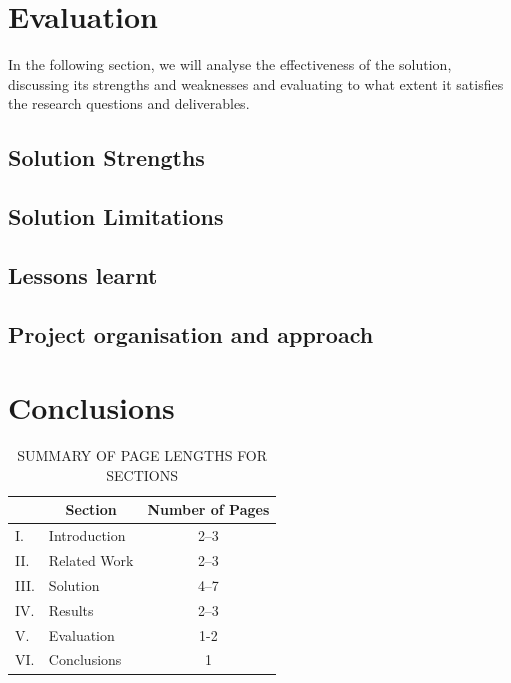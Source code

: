\documentclass[12pt,a4paper]{article}
\begin{document}

\section{Evaluation}
In the following section, we will analyse the effectiveness of the solution, discussing its strengths and weaknesses and evaluating to what extent it satisfies the research questions and deliverables.

\subsection{Solution Strengths}

\subsection{Solution Limitations}

\subsection{Lessons learnt}

\subsection{Project organisation and approach}




\section{Conclusions}



\begin{table}[htb]
\centering
\caption{SUMMARY OF PAGE LENGTHS FOR SECTIONS}
\vspace*{6pt}
\label{summary}
\begin{tabular}{|ll|c|} \hline
& \multicolumn{1}{c|}{\bf Section} & {\bf Number of Pages} \\ \hline
I. & Introduction & 2--3 \\ \hline
II. & Related Work & 2--3 \\ \hline
III. & Solution & 4--7 \\ \hline
IV. & Results & 2--3 \\ \hline
V. & Evaluation & 1-2 \\ \hline
VI. & Conclusions & 1 \\ \hline
\end{tabular}
\end{table}



\end{document}
